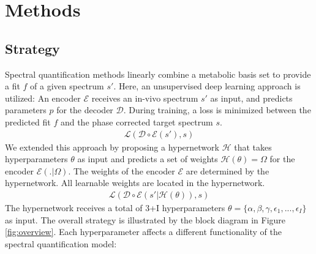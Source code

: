 \documentclass{article}
\begin{document}
\section{Methods}
    
    \subsection{Strategy}
        Spectral quantification methods linearly combine a metabolic basis set to provide a fit $f$ of a given spectrum $s'$. Here, an unsupervised deep learning approach is utilized: An encoder $\mathcal{E}$ receives an in-vivo spectrum $s'$ as input, and predicts parameters $p$ for the decoder $\mathcal{D}$. During training, a loss is minimized between the predicted fit $f$ and the phase corrected target spectrum $s$.
        \begin{align}
            \mathcal{L}(\mathcal{D}\circ\mathcal{E}(s'),s)
        \end{align}
        We extended this approach by proposing a hypernetwork $\mathcal{H}$ that takes hyperparameters $\theta$ as input and predicts a set of weights $\mathcal{H}(\theta)=\Omega$ for the encoder $\mathcal{E}(.|\Omega)$. The weights of the encoder $\mathcal{E}$ are determined by the hypernetwork. All learnable weights are located in the hypernetwork.
        \begin{align}
            \mathcal{L}(\mathcal{D}\circ\mathcal{E}(s'|\mathcal{H}(\theta)),s)
        \end{align}
        The hypernetwork receives a total of 3+I hyperparameters $\theta = \{\alpha, \beta, \gamma, \epsilon_1,...,\epsilon_I\}$ as input.%
        The overall strategy is illustrated by the block diagram in Figure \ref{fig:overview}. Each hyperparameter affects a different functionality of the spectral quantification model:
\end{document}

